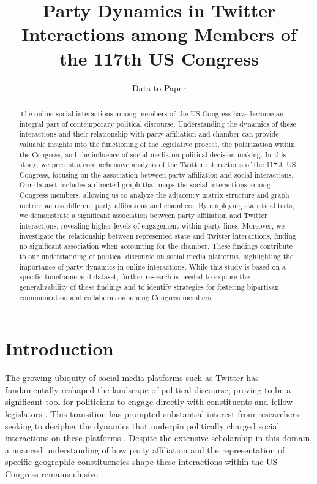 \documentclass[11pt]{article}
\title{Party Dynamics in Twitter Interactions among Members of the 117th US Congress}
\author{Data to Paper}
\begin{document}
\maketitle
\begin{abstract}
The online social interactions among members of the US Congress have become an integral part of contemporary political discourse. Understanding the dynamics of these interactions and their relationship with party affiliation and chamber can provide valuable insights into the functioning of the legislative process, the polarization within the Congress, and the influence of social media on political decision-making. In this study, we present a comprehensive analysis of the Twitter interactions of the 117th US Congress, focusing on the association between party affiliation and social interactions. Our dataset includes a directed graph that maps the social interactions among Congress members, allowing us to analyze the adjacency matrix structure and graph metrics across different party affiliations and chambers. By employing statistical tests, we demonstrate a significant association between party affiliation and Twitter interactions, revealing higher levels of engagement within party lines. Moreover, we investigate the relationship between represented state and Twitter interactions, finding no significant association when accounting for the chamber. These findings contribute to our understanding of political discourse on social media platforms, highlighting the importance of party dynamics in online interactions. While this study is based on a specific timeframe and dataset, further research is needed to explore the generalizability of these findings and to identify strategies for fostering bipartisan communication and collaboration among Congress members.
\end{abstract}
\section*{Introduction}

The growing ubiquity of social media platforms such as Twitter has fundamentally reshaped the landscape of political discourse, proving to be a significant tool for politicians to engage directly with constituents and fellow legislators \cite{Muragod2018TheSM, Garimella2018PoliticalDO}. This transition has prompted substantial interest from researchers seeking to decipher the dynamics that underpin politically charged social interactions on these platforms \cite{Hua2020CharacterizingTU, Stier2018ElectionCO, Eady2019HowMP}. Despite the extensive scholarship in this domain, a nuanced understanding of how party affiliation and the representation of specific geographic constituencies shape these interactions within the US Congress remains elusive \cite{Baviera2018InfluenceIT, Luceri2019RedBD, Marder2016AnEO}.
\end{document}
